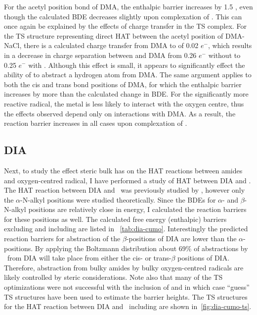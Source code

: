 For the acetyl position  bond of DMA, the enthalpic barrier increases by 1.5 \kcalmol, even though the calculated BDE decreases slightly upon complexation of . This can once again be explained by the effects of charge transfer in the TS complex. For the TS structure representing direct HAT between  the acetyl position of DMA-NaCl, there is a calculated charge transfer from DMA to  of 0.02 $e^-$, which results in a decrease in charge separation between  and DMA from 0.26 $e^-$ without  to 0.25 $e^-$ with . Although this effect is small, it appears to significantly effect the ability of  to abstract a hydrogen atom from DMA. The same argument applies to both the cis and trans  bond positions of DMA, for which the enthalpic barrier increases by more than the calculated change in BDE. For the significantly more reactive  radical, the metal is less likely to interact with the oxygen centre, thus the effects observed depend only on interactions with DMA. As a result, the reaction barrier increases in all cases upon complexation of .

\subsection{DIA}

Next, to study the effect steric bulk has on the HAT reactions between amides and oxygen-centred radical, I have performed a study of HAT between DIA and \cumo. The HAT reaction between DIA and \cumo\ was previously studied by \citet{Salamone2014}, however only the $\alpha$-N-alkyl positions were studied theoretically. Since the BDEs for $\alpha$- and $\beta$-N-alkyl  positions are relatively close in energy, I calculated the reaction barriers for these positions as well. The calculated free energy (enthalpic) barriers excluding and including  are listed in ~\ref{tab:dia-cumo}. Interestingly the predicted reaction barriers for abstraction of the $\beta$-positions of DIA are lower than the $\alpha$-positions. By applying the Boltzmann distribution about 69\% of abstractions by \cumo\ from DIA will take place from either the cis- or trans-$\beta$ positions of DIA. Therefore, abstraction from bulky amides by bulky oxygen-centred radicals are likely controlled by steric considerations. Note also that many of the TS optimizations were not successful with the inclusion of  and in which case ``guess'' TS structures have been used to estimate the barrier heights. The TS structures for the HAT reaction between DIA and \cumo\ including  are shown in~\ref{fig:dia-cumo-ts}.

